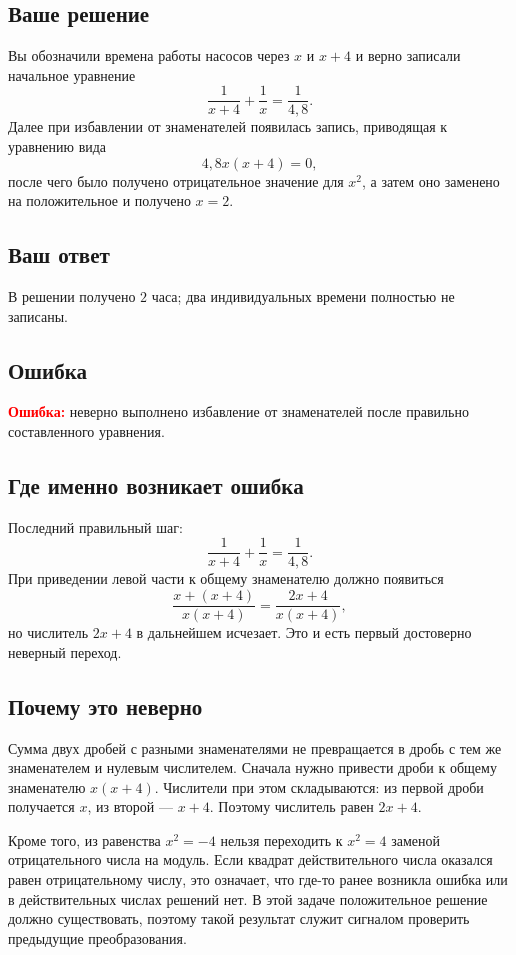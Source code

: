\documentclass[12pt,a4paper]{article}
\newcommand{\err}{\textcolor{red}{\textbf{Ошибка:}}}
\begin{document}
\subsection*{Ваше решение}
Вы обозначили времена работы насосов через $x$ и $x+4$ и верно записали начальное уравнение
\[
\frac{1}{x+4}+\frac{1}{x}=\frac{1}{4{,}8}.
\]
Далее при избавлении от знаменателей появилась запись, приводящая к уравнению вида
\[
4{,}8x(x+4)=0,
\]
после чего было получено отрицательное значение для $x^2$, а затем оно заменено на положительное и получено $x=2$.

\subsection*{Ваш ответ}
В решении получено $2$ часа; два индивидуальных времени полностью не записаны.

\subsection*{Ошибка}
\err{} неверно выполнено избавление от знаменателей после правильно составленного уравнения.

\subsection*{Где именно возникает ошибка}
Последний правильный шаг:
\[
\frac{1}{x+4}+\frac{1}{x}=\frac{1}{4{,}8}.
\]
При приведении левой части к общему знаменателю должно появиться
\[
\frac{x+(x+4)}{x(x+4)}=\frac{2x+4}{x(x+4)},
\]
но числитель $2x+4$ в дальнейшем исчезает. Это и есть первый достоверно неверный переход.

\subsection*{Почему это неверно}
Сумма двух дробей с разными знаменателями не превращается в дробь с тем же знаменателем и нулевым числителем. Сначала нужно привести дроби к общему знаменателю $x(x+4)$. Числители при этом складываются: из первой дроби получается $x$, из второй --- $x+4$. Поэтому числитель равен $2x+4$.

Кроме того, из равенства $x^2=-4$ нельзя переходить к $x^2=4$ заменой отрицательного числа на модуль. Если квадрат действительного числа оказался равен отрицательному числу, это означает, что где-то ранее возникла ошибка или в действительных числах решений нет. В этой задаче положительное решение должно существовать, поэтому такой результат служит сигналом проверить предыдущие преобразования.
\end{document}
